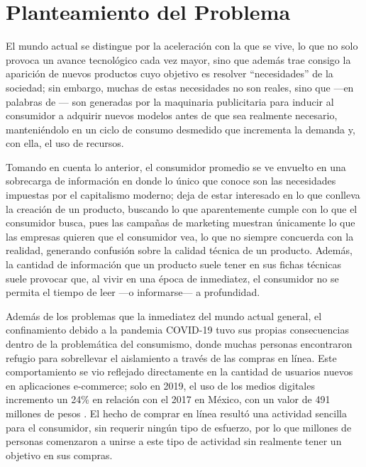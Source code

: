 \section{Planteamiento del Problema}

El mundo actual se distingue por la aceleración con la que se vive, lo que no
solo provoca un avance tecnológico cada vez mayor, sino que además trae consigo
la aparición de nuevos productos cuyo objetivo es resolver ``necesidades'' de la
sociedad; sin embargo, muchas de estas necesidades no son reales, sino que —en
palabras de \textcite[p.~347]{martinez2016}— son generadas por la maquinaria
publicitaria para inducir al consumidor a adquirir nuevos modelos antes de que
sea realmente necesario, manteniéndolo en un ciclo de consumo desmedido que
incrementa la demanda y, con ella, el uso de recursos.

Tomando en cuenta lo anterior, el consumidor promedio se ve envuelto en una
sobrecarga de información en donde lo único que conoce son las necesidades
impuestas por el capitalismo moderno; deja de estar interesado en lo que
conlleva la creación de un producto, buscando lo que aparentemente cumple con lo
que el consumidor busca, pues las campañas de marketing muestran únicamente lo
que las empresas quieren que el consumidor vea, lo que no siempre concuerda con
la realidad, generando confusión sobre la calidad técnica de un producto.
Además, la cantidad de información que un producto suele tener en sus fichas
técnicas suele provocar que, al vivir en una época de inmediatez, el consumidor
no se permita el tiempo de leer —o informarse— a profundidad. 

Además de los problemas que la inmediatez del mundo actual general, el
confinamiento debido a la pandemia COVID-19 tuvo sus propias consecuencias
dentro de la problemática del consumismo, donde muchas personas encontraron
refugio para sobrellevar el aislamiento a través de las compras en línea. Este
comportamiento se vio reflejado directamente en la cantidad de usuarios nuevos
en aplicaciones e-commerce; solo en 2019, el uso de los medios digitales
incremento un 24\% en relación con el 2017 en México, con un valor de 491
millones de pesos \parencite[p.~123]{bejar2023}. El hecho de comprar en línea
resultó una actividad sencilla para el consumidor, sin requerir ningún tipo de
esfuerzo, por lo que millones de personas comenzaron a unirse a este tipo de
actividad sin realmente tener un objetivo en sus compras. 

